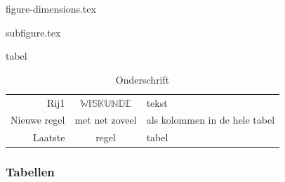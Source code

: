 \documentclass{cursuspresentatie}
\def\importslide#1#2{%
	{#2}
}
\begin{document}
\importslide{images}{figure-dimensions.tex}

\importslide{images}{subfigure.tex}

\begin{saveblock}{tabel}
    \begin{highlightblock}
        \begin{table}
            \centering
            \begin{tabular}{||r|c|l||}%
                Rij1 & $\mathbb{WISKUNDE}$ & tekst\\
                Nieuwe regel & met net zoveel & als kolommen in
                de hele tabel\\
                \hline
                Laatste & regel & tabel
            \end{tabular}
            \caption{Onderschrift}
            \label{tab: tabel}
        \end{table}
    \end{highlightblock}
\end{saveblock}

\begin{frame}
	\frametitle{Tabellen}
\end{frame}
\end{document}
